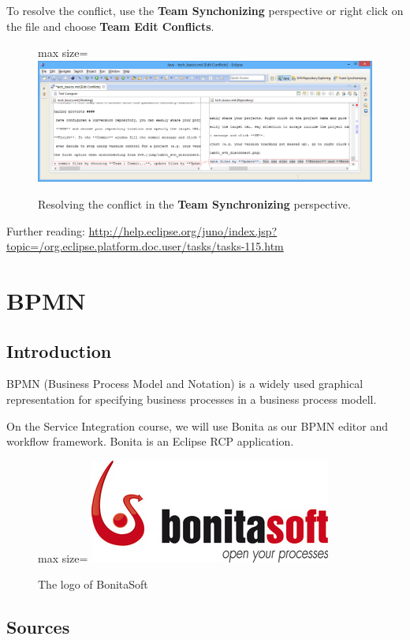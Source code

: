 \documentclass[]{report}
\let\Oldincludegraphics\includegraphics
\renewcommand{\includegraphics}[1]{
\begin{adjustbox}{max size={\textwidth}{\textheight}}
    \Oldincludegraphics[scale=0.6]{#1}%
\end{adjustbox}
}
\begin{document}
To resolve the conflict, use the \textbf{Team Synchonizing} perspective
or right click on the file and choose \textbf{Team \textbar{} Edit
Conflicts}.

\begin{figure}[htbp]
\centering
\includegraphics{img/eclipse_basics/svn_conflict_resolve.png}
\caption{Resolving the conflict in the \textbf{Team Synchronizing}
perspective.}
\end{figure}

Further reading:
\url{http://help.eclipse.org/juno/index.jsp?topic=/org.eclipse.platform.doc.user/tasks/tasks-115.htm}

\chapter{BPMN}

\section{Introduction}

BPMN (Business Process Model and Notation) is a widely used graphical
representation for specifying business processes in a business process
modell.

On the Service Integration course, we will use Bonita as our BPMN editor
and workflow framework. Bonita is an Eclipse RCP application.

\begin{figure}[htbp]
\centering
\includegraphics{img/bpmn/bonita_logo.png}
\caption{The logo of BonitaSoft}
\end{figure}

\section{Sources}
\end{document}
